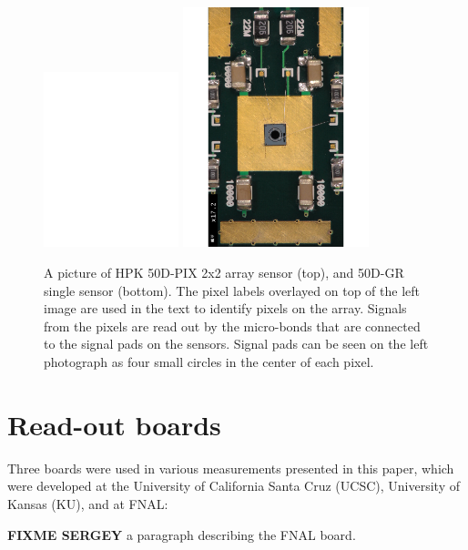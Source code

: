 \documentclass[preprint,1p]{elsarticle}
\begin{document}
\begin{figure}[htbp] 
\centering
\includegraphics[width=0.35\textwidth]{figs/HPK-50DPix.pdf} 
\includegraphics[width=0.48\textwidth]{figs/HPK-50D.pdf} 
\caption{A picture of HPK 50D-PIX 2x2 array sensor (top), and 50D-GR single sensor (bottom). The pixel labels overlayed on top of the left image are used in the text to identify pixels on the array. Signals from the pixels are read out by the micro-bonds that are connected to the signal pads on the sensors. Signal pads can be seen on the left photograph as four small circles in the center of each pixel. } 
\label{fig:HPK_Sensors} 
\end{figure} 


\section{Read-out boards}

Three boards were used in various measurements presented in this paper, which
were developed at the University of California Santa Cruz (UCSC), University of
Kansas (KU), and at FNAL:

\textbf {FIXME SERGEY} a paragraph describing the FNAL board. 
\end{document}
